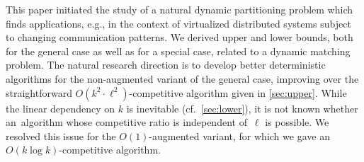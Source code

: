 \documentclass{siamart190516}
\begin{document}
This paper initiated the study of a natural dynamic partitioning problem which
finds applications, e.g., in the context of virtualized distributed systems
subject to changing communication patterns. We derived upper and lower bounds,
both for the general case as well as for a special case, related to a dynamic
matching problem. The natural research direction is to develop better
deterministic algorithms for the non-augmented variant of the general case,
improving over the straightforward $O(k^2 \cdot \ell^2)$-competitive algorithm
given in \cref{sec:upper}. While the linear dependency on $k$ is
inevitable (cf.~\cref{sec:lower}), it is not known whether
an~algorithm whose competitive ratio is independent of~$\ell$ is possible. We
resolved this issue for the $O(1)$-augmented variant, for which we gave an
$O(k \log k)$-competitive algorithm.



\end{document}
